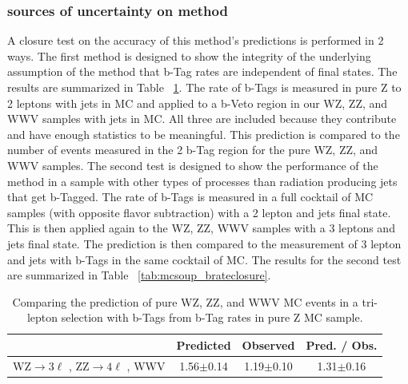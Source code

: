         		\subsubsection{sources of uncertainty on method}
		A closure test on the accuracy of this method's predictions is performed in 2 ways. The first method is designed to show the integrity of the underlying assumption of the method that b-Tag rates are independent of final states. The results are summarized in Table ~\ref{tab:wz_z_brateclosure}. The rate of b-Tags is measured in pure Z to 2 leptons with jets in MC and applied to a b-Veto region in our WZ, ZZ, and WWV samples with jets in MC. All three are included because they contribute and have enough statistics to be meaningful. This prediction is compared to the number of events measured in the 2 b-Tag region for the pure WZ, ZZ, and WWV samples. The second test is designed to show the performance of the method in a sample with other types of processes than radiation producing jets that get b-Tagged. The rate of b-Tags is measured in a full cocktail of MC samples (with opposite flavor subtraction) with a 2 lepton and jets final state. This is then applied again to the WZ, ZZ, WWV samples with a 3 leptons and jets final state. The prediction is then compared to the measurement of 3 lepton and jets with b-Tags in the same cocktail of MC. The results for the second test are summarized in Table ~\ref{tab:mcsoup_brateclosure}.\\

\begin{table}[ht!]
\begin{center}
\caption{\small \label{tab:wz_z_brateclosure} Comparing the prediction of pure WZ, ZZ, and WWV MC events in a tri-lepton selection with b-Tags from b-Tag rates in pure Z MC sample.}
\begin{tabular}{c|ccc}\hline
                                                                                               & Predicted            & Observed          & Pred. / Obs.\\
\hline \hline
WZ$\rightarrow 3\ell $ , ZZ$\rightarrow 4\ell$ , WWV  &  1.56$\pm$0.14 & 1.19$\pm$0.10 & 1.31$\pm$0.16\\		
\hline
\end{tabular}
\end{center}
\end{table}

